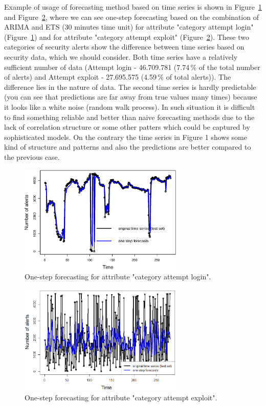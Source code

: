 \documentclass[runningheads]{llncs}
\begin{document}
Example of usage of forecasting method based on time series is shown in Figure~\ref{fig:forecast_attempt_login} and Figure~\ref{fig:forecast_attempt_exploit}, where we can see one-step forecasting based on the combination of ARIMA and ETS (30 minutes time unit) for attribute "category attempt login" (Figure~\ref{fig:forecast_attempt_login}) and for attribute "category attempt exploit" (Figure~\ref{fig:forecast_attempt_exploit}). These two categories of security alerts show the difference between time series based on security data, which we should consider. Both time series have a relatively sufficient number of data (Attempt login - 46.709.781 (7.74\,\% of the total number of alerts) and Attempt exploit - 27.695.575 (4.59\,\% of total alerts)). The difference lies in the nature of data. The second time series is hardly predictable~\cite{hendry1995dynamic} (you can see that predictions are far away from true values many times) because it looks like a white noise (random walk process). In such  situation it is difficult to find something reliable and better than naive forecasting methods due to the lack of correlation structure or some other patters which could be captured by sophisticated models. On the contrary the time series in Figure 1 shows some kind of structure and patterns and also the predictions are better compared to the previous case.  

\begin{figure}[h]
  \centering
  \includegraphics[width=0.7\textwidth]{images/item61_1step_forecasts_new.eps}
  \caption{One-step forecasting for attribute "category attempt login".} 
  \label{fig:forecast_attempt_login}
\end{figure}

\begin{figure}[h]
  \centering
  \includegraphics[width=0.7\textwidth]{images/item62_1step_forecasts_new.eps}
  \caption{One-step forecasting for attribute "category attempt exploit". }
  \label{fig:forecast_attempt_exploit}
\end{figure}
\end{document}
